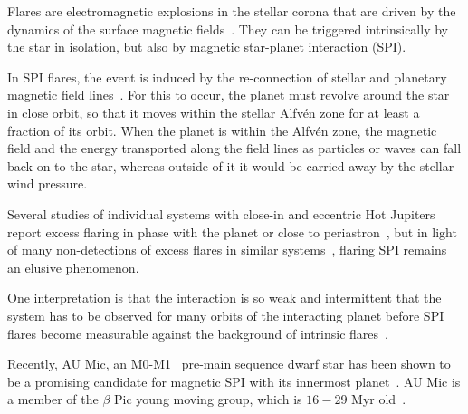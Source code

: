 \documentclass[fleqn,usenatbib,letters]{mnras}%
\begin{document}
Flares are electromagnetic explosions in the stellar corona that are driven by the dynamics of the surface magnetic fields~\citep{benz2010}. They can be triggered intrinsically by the star in isolation, but also by magnetic star-planet interaction (SPI).

In SPI flares, the event is induced by the re-connection of stellar and planetary magnetic field lines~\citep{saur2013,lanza2018close-by,fischer2019}. For this to occur, the planet must revolve around the star in close orbit, so that it moves within the stellar Alfv\'en zone for at least a fraction of its orbit. When the planet is within the Alfv\'en zone, the magnetic field and the energy transported along the field lines as particles or waves can fall back on to the star, whereas outside of it it would be carried away by the stellar wind pressure. 



Several studies of individual systems with close-in and eccentric Hot Jupiters report excess flaring in phase with the planet or close to periastron~\citep{shkolnik2005,pillitteri2011,maggio2015}, but in light of many non-detections of excess flares in similar systems~\citep{figueira2016, fischer2019}, flaring SPI remains an elusive phenomenon. 

One interpretation is that the interaction is so weak and intermittent that the system has to be observed for many orbits of the interacting planet before SPI flares become measurable against the background of intrinsic flares~\citep{shkolnik2008,lanza2009, saur2013,strugarek2015}.

Recently, AU Mic, an M0-M1~\citep{pecaut2013,gaidos2014} pre-main sequence dwarf star has been shown to be a promising candidate for magnetic SPI with its innermost planet~\citep{kavanagh2021}. AU Mic is a member of the $\beta$ Pic young moving group, which is $16-29$ Myr old~\citep{malo2014,binks2014,mamajek2014,bell2015,binks2016,shkolnik2017,miretroig2020}. %
\end{document}

